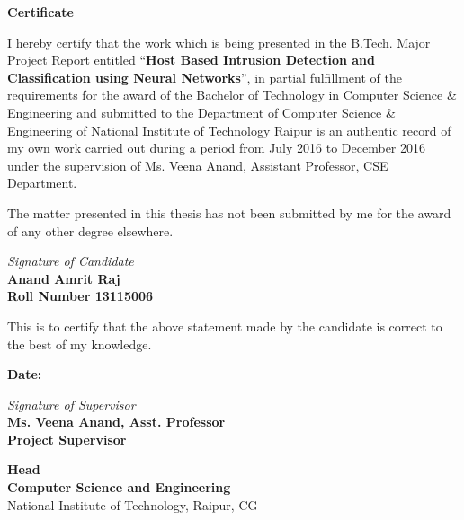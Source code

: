 \documentclass[12pt]{article}
\newcommand{\projectTitle}{Host Based Intrusion Detection and Classification using Neural Networks}
\newcommand{\quotes}[1]{``#1''}
\begin{document}
	
	\begin{titlepage}
		
		\textbf{%
			\hfill
			\Large Certificate \hfill\hfill\\
		}
		\vspace{15pt}
		
		I hereby certify that the work which is being presented in the B.Tech. Major Project Report entitled \quotes{\textbf{\projectTitle}}, in partial fulfillment of the requirements for the award of the Bachelor  of Technology in Computer Science \& Engineering and submitted to the Department of Computer Science \& Engineering of National Institute of Technology Raipur  is an authentic record of my own work carried out during a period from July 2016 to December 2016 under the supervision of  Ms. Veena Anand, Assistant Professor, CSE Department. 

		The matter presented in this thesis has not been submitted by me for the award of any other degree elsewhere.\\
		[.25in]
		\begin{flushright}
			\textit{Signature of Candidate}\\
				\textbf{Anand Amrit Raj \\
				Roll Number 13115006\\}
		\end{flushright}
	\vspace{10pt}
	This is to certify that the above statement made by the candidate is correct to the best of my knowledge.

		\begin{flushleft}
			\textbf{Date:}
		\end{flushleft}
		\begin{flushright}
			\textit{Signature of Supervisor}\\
				\textbf{Ms. Veena Anand, Asst. Professor\\
				Project Supervisor\\}
		\end{flushright}
		\vspace{30pt}
		\begin{flushleft}
			\textbf{\large Head}\\
			\textbf{Computer Science and Engineering}\\
			National Institute of Technology, Raipur, CG
		\end{flushleft}
	\end{titlepage}
	
\end{document}
